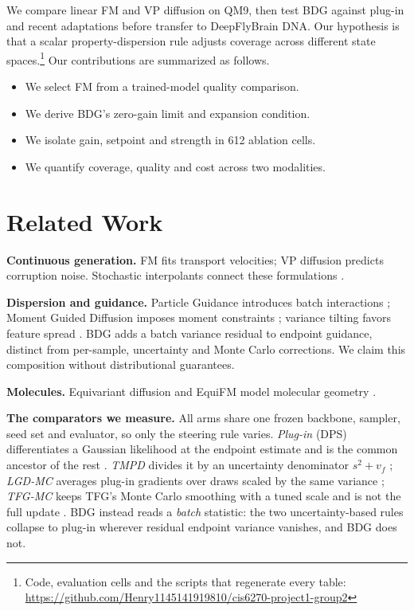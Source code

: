 \documentclass{article}
\begin{document}
We compare linear FM and VP diffusion on QM9, then test BDG against plug-in and recent adaptations before transfer to DeepFlyBrain DNA. Our hypothesis is that a scalar property-dispersion rule adjusts coverage across different state spaces.\footnote{Code, evaluation cells and the scripts that regenerate every table: \url{https://github.com/Henry1145141919810/cis6270-project1-group2}}
Our contributions are summarized as follows.
\begin{itemize}
\item We select FM from a trained-model quality comparison.
\item We derive BDG's zero-gain limit and expansion condition.
\item We isolate gain, setpoint and strength in 612 ablation cells.
\item We quantify coverage, quality and cost across two modalities.
\end{itemize}
\section{Related Work}
\textbf{Continuous generation.} FM fits transport velocities; VP diffusion predicts corruption noise. Stochastic interpolants connect these formulations \citep{lipman2022flow,albergo2025stochastic}.

\textbf{Dispersion and guidance.} Particle Guidance introduces batch interactions \citep{corso2024particle}; Moment Guided Diffusion imposes moment constraints \citep{mgd2026moment}; variance tilting favors feature spread \citep{vtd2026variance}. BDG adds a batch variance residual to endpoint guidance, distinct from per-sample, uncertainty and Monte Carlo corrections. We claim this composition without distributional guarantees.

\textbf{Molecules.} Equivariant diffusion and EquiFM model molecular geometry \citep{hoogeboom2022equivariant,song2023equifm}.

\textbf{The comparators we measure.} All arms share one frozen backbone, sampler, seed set and evaluator, so only the steering rule varies. \emph{Plug-in} (DPS) differentiates a Gaussian likelihood at the endpoint estimate and is the common ancestor of the rest \citep{chung2023dps}. \emph{TMPD} divides it by an uncertainty denominator $s^2+v_f$ \citep{boys2024tmpd}; \emph{LGD-MC} averages plug-in gradients over draws scaled by the same variance \citep{song2023lgd}; \emph{TFG-MC} keeps TFG's Monte Carlo smoothing with a tuned scale and is not the full update \citep{ye2024tfg}. BDG instead reads a \emph{batch} statistic: the two uncertainty-based rules collapse to plug-in wherever residual endpoint variance vanishes, and BDG does not.
\end{document}
